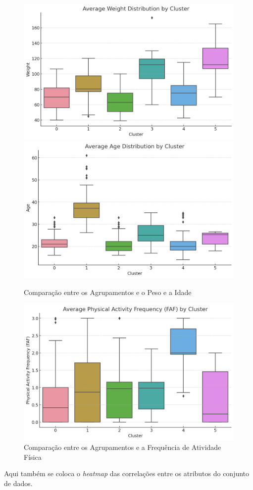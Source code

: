 \documentclass{easychair}
\begin{document}
\begin{figure}[hbt!]
  \centering
  \begin{minipage} %
    {\linewidth}
    \includegraphics[width=0.45\linewidth]{images/cluster-weight.jpg}
    \includegraphics[width=0.45\linewidth]{images/cluster-age.jpg}
  \end{minipage}
  \caption{Comparação entre os Agrupamentos e o Peso e a Idade}
  \label{fig:cluster-weight-age}

  \centering
  \begin{minipage}
    {\linewidth}
    \includegraphics[width=0.9\linewidth]{images/cluster-faf.jpg}
  \end{minipage}
  \caption{Comparação entre os Agrupamentos e a Frequência de Atividade Física}
  \label{fig:cluster-faf}
\end{figure}

Aqui também se coloca o \textit{heatmap} das correlações entre os atributos do conjunto de dados.
\end{document}
